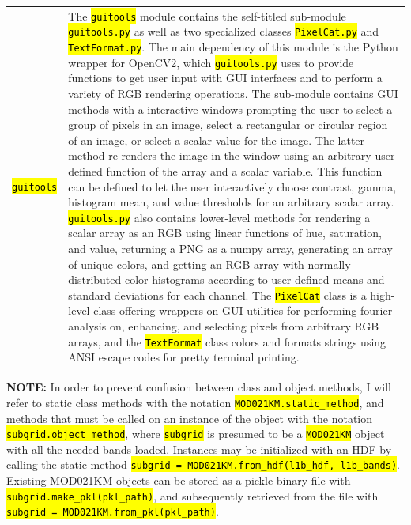 \documentclass[12pt]{article}
\newcommand{\hltexttt}[1]{\texttt{\hl{#1}}}
\begin{document}
\begin{table}[h]
\begin{tabular}{ l p{14cm}}
        \hltexttt{guitools} &
        The \hltexttt{guitools} module contains the self-titled sub-module \hltexttt{guitools.py} as well as two specialized classes \hltexttt{PixelCat.py} and \hltexttt{TextFormat.py}. The main dependency of this module is the Python wrapper for OpenCV2, which \hltexttt{guitools.py} uses to provide functions to get user input with GUI interfaces and to perform a variety of RGB rendering operations. The sub-module contains GUI methods with a interactive windows prompting the user to select a group of pixels in an image, select a rectangular or circular region of an image, or select a scalar value for the image. The latter method re-renders the image in the window using an arbitrary user-defined function of the array and a scalar variable. This function can be defined to let the user interactively choose contrast, gamma, histogram mean, and value thresholds for an arbitrary scalar array. \hltexttt{guitools.py} also contains lower-level methods for rendering a scalar array as an RGB using linear functions of hue, saturation, and value, returning a PNG as a numpy array, generating an array of unique colors, and getting an RGB array with normally-distributed color histograms according to user-defined means and standard deviations for each channel. The \hltexttt{PixelCat} class is a high-level class offering wrappers on GUI utilities for performing fourier analysis on, enhancing, and selecting pixels from arbitrary RGB arrays, and the \hltexttt{TextFormat} class colors and formats strings using ANSI escape codes for pretty terminal printing.

    \end{tabular}
\end{table}

\clearpage

{\footnotesize
\noindent
\textbf{NOTE:} In order to prevent confusion between class and object methods, I will refer to static class methods with the notation \hltexttt{MOD021KM.static\_method}, and methods that must be called on an instance of the object with the notation \hltexttt{subgrid.object\_method}, where \hltexttt{subgrid} is presumed to be a \hltexttt{MOD021KM} object with all the needed bands loaded. Instances may be initialized with an HDF by calling the static method \hltexttt{subgrid = MOD021KM.from\_hdf(l1b\_hdf, l1b\_bands)}. Existing MOD021KM objects can be stored as a pickle binary file with \hltexttt{subgrid.make\_pkl(pkl\_path)}, and subsequently retrieved from the file with \hltexttt{subgrid = MOD021KM.from\_pkl(pkl\_path)}.
}
\end{document}
